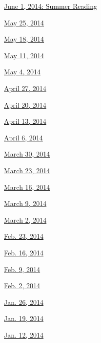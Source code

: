 \href{http://www.nytimes.com/indexes/2014/06/01/books/review/index.html}{June
1, 2014: Summer Reading}

\href{http://www.nytimes.com/indexes/2014/05/25/books/review/index.html}{May
25, 2014}

\href{http://www.nytimes.com/indexes/2014/05/18/books/review/index.html}{May
18, 2014}

\href{http://www.nytimes.com/indexes/2014/05/11/books/review/index.html}{May
11, 2014}

\href{http://www.nytimes.com/indexes/2014/05/04/books/review/index.html}{May
4, 2014}

\href{http://www.nytimes.com/indexes/2014/04/27/books/review/index.html}{April
27, 2014}

\href{http://www.nytimes.com/indexes/2014/04/20/books/review/index.html}{April
20, 2014}

\href{http://www.nytimes.com/indexes/2014/04/13/books/review/index.html}{April
13, 2014}

\href{http://www.nytimes.com/indexes/2014/04/06/books/review/index.html}{April
6, 2014}

\href{http://www.nytimes.com/indexes/2014/03/30/books/review/index.html}{March
30, 2014}

\href{http://www.nytimes.com/indexes/2014/03/23/books/review/index.html}{March
23, 2014}

\href{http://www.nytimes.com/indexes/2014/03/16/books/review/index.html}{March
16, 2014}

\href{http://www.nytimes.com/indexes/2014/03/09/books/review/index.html}{March
9, 2014}

\href{http://www.nytimes.com/indexes/2014/03/02/books/review/index.html}{March
2, 2014}

\href{http://www.nytimes.com/indexes/2014/02/23/books/review/index.html}{Feb.
23, 2014}

\href{http://www.nytimes.com/indexes/2014/02/16/books/review/index.html}{Feb.
16, 2014}

\href{http://www.nytimes.com/indexes/2014/02/09/books/review/index.html}{Feb.
9, 2014}

\href{http://www.nytimes.com/indexes/2014/02/02/books/review/index.html}{Feb.
2, 2014}

\href{http://www.nytimes.com/indexes/2014/01/26/books/review/index.html}{Jan.
26, 2014}

\href{http://www.nytimes.com/indexes/2014/01/19/books/review/index.html}{Jan.
19, 2014}

\href{http://www.nytimes.com/indexes/2014/01/12/books/review/index.html}{Jan.
12, 2014}

